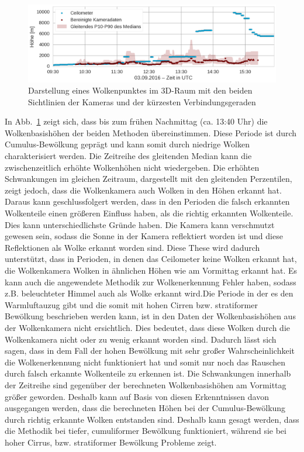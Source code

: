 \documentclass[a4paper,11pt,twoside,german]{article}
\newcommand{\absatz}{\smallbreak}
\begin{document}
\begin{figure}[h]
	\begin{center}
		\includegraphics[width=1\textwidth]{media/ceilo_cam_new.png}
		\caption[Zeitreihenvergleich Wolkenkameras mit Ceilometer]{Darstellung eines Wolkenpunktes im 3D-Raum mit den beiden Sichtlinien der Kameras und der kürzesten Verbindungsgeraden}
		\label{FIGCeilo}
	\end{center}
\end{figure}
In Abb.~\ref{FIGCeilo} zeigt sich, dass bis zum frühen Nachmittag (ca. 13:40
Uhr) die Wolkenbasishöhen der beiden Methoden übereinstimmen. Diese Periode ist
durch Cumulus-Bewölkung geprägt und kann somit durch niedrige Wolken
charakterisiert werden. Die Zeitreihe des gleitenden Median kann die
zwischenzeitlich erhöhte Wolkenhöhen nicht wiedergeben. Die erhöhten
Schwankungen im gleichen Zeitraum, dargestellt mit den gleitenden Perzentilen,
zeigt jedoch, dass die Wolkenkamera auch Wolken in den Höhen erkannt hat. Daraus
kann geschlussfolgert werden, dass in den Perioden die falsch erkannten
Wolkenteile einen größeren Einfluss haben, als die richtig erkannten
Wolkenteile. Dies kann unterschiedlichste Gründe haben. Die Kamera kann
verschmutzt gewesen sein, sodass die Sonne in der Kamera reflektiert worden ist
und diese Reflektionen als Wolke erkannt worden sind. Diese These wird dadurch
unterstützt, dass in Perioden, in denen das Ceilometer keine Wolken erkannt hat,
die Wolkenkamera Wolken in ähnlichen Höhen wie am Vormittag erkannt hat. Es kann
auch die angewendete Methodik zur Wolkenerkennung Fehler haben, sodass z.B.
beleuchteter Himmel auch als Wolke erkannt wird.\absatz Die Periode in der es
den Warmluftauzug gibt und die somit mit hohen Cirren bzw. stratiformer
Bewölkung beschrieben werden kann, ist in den Daten der Wolkenbasishöhen aus der
Wolkenkamera nicht ersichtlich. Dies bedeutet, dass diese Wolken durch die
Wolkenkamera nicht oder zu wenig erkannt worden sind. Dadurch lässt sich sagen,
dass in dem Fall der hohen Bewölkung mit sehr großer Wahrscheinlichkeit die
Wolkenerkennung nicht funktioniert hat und somit nur noch das Rauschen durch
falsch erkannte Wolkenteile zu erkennen ist. Die Schwankungen innerhalb der
Zeitreihe sind gegenüber der berechneten Wolkenbasishöhen am Vormittag größer
geworden. Deshalb kann auf Basis von diesen Erkenntnissen davon ausgegangen
werden, dass die berechneten Höhen bei der Cumulus-Bewölkung durch richtig
erkannte Wolken entstanden sind. Deshalb kann gesagt werden, dass die Methodik
bei tiefer, cumuliformer Bewölkung funktioniert, während sie bei hoher Cirrus,
bzw. stratiformer Bewölkung Probleme zeigt.  
\end{document}
